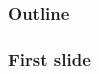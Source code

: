 \documentclass{beamer}
\author[Stroppa and Chrupala]{Grzegorz Chrupa{\l}a and Nicolas Stroppa}
\institute[Google + Saarland] %
{
Google\\
Saarland University
}
\date[2010] %
{META}
\begin{document}
\frame{\titlepage}

\begin{frame}
  \frametitle{Outline}
  \tableofcontents
\end{frame}


\begin{frame}\frametitle{First slide}

\end{frame}
\end{document}
